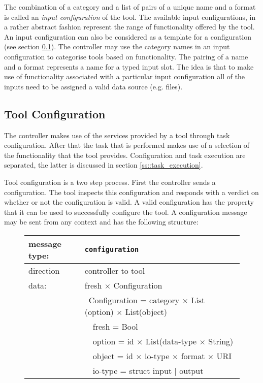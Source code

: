 \documentclass{article}
\newcommand{\msg}[1]{\texttt{#1}}
\begin{document}
   \noindent The combination of a category and a list of pairs of a unique name and a
   format is called an \textit{input configuration} of the tool.  The available
   input configurations, in a rather abstract fashion represent the range of
   functionality offered by the tool.  An input configuration can also be
   considered as a template for a configuration (see section
   \ref{ss::tool_configuration}). The controller may use the category names
   in an input configuration to categorise tools based on functionality. The
   pairing of a name and a format represents a name for a typed input slot. The
   idea is that to make use of functionality associated with a particular input
   configuration all of the inputs need to be assigned a valid data source
   (e.g. files).

  \subsection{Tool Configuration} \label{ss::tool_configuration}

   The controller makes use of the services provided by a tool through task
   configuration. After that the task that is performed makes use of a
   selection of the functionality that the tool provides.  Configuration and
   task execution are separated, the latter is discussed in section
   \ref{ss::task_execution}.

   Tool configuration is a two step process. First the controller sends a
   configuration. The tool inspects this configuration and responds with a
   verdict on whether or not the configuration is valid. A valid configuration
   has the property that it can be used to successfully configure the tool. A
   configuration message may be sent from any context and has the following
   structure:

   \begin{figure}[H]
    \begin{center}
     \begin{tabular}{|ll|}
      \hline
       message type:   & \msg{configuration} \\
      \hline
       direction       & controller to tool \\
       data:           & fresh $\times$ Configuration \\
                       & \ Configuration = category $\times$ List (option) $\times$ List(object) \\
                       & \ \ fresh   = Bool \\
                       & \ \ option  = id $\times$ List(data-type $\times$ String) \\
                       & \ \ object  = id $\times$ io-type $\times$ format $\times$ URI \\
                       & \ \ io-type = struct input $|$ output \\
      \hline
     \end{tabular}
    \end{center}
   \end{figure}
\end{document}

